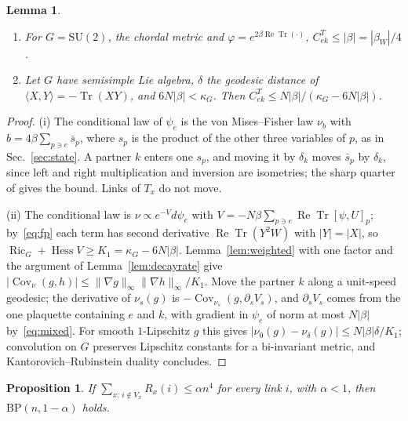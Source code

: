 \documentclass[11pt]{amsart}
\newtheorem{lemma}[theorem]{Lemma}
\newtheorem{proposition}[theorem]{Proposition}
\theoremstyle{definition}
\theoremstyle{remark}
\numberwithin{equation}{section}
\newcommand{\SU}{\mathrm{SU}}
\newcommand{\Tr}{\operatorname{Tr}}
\newcommand{\ReTr}{\operatorname{Re}\operatorname{Tr}}
\newcommand{\Hess}{\operatorname{Hess}}
\newcommand{\Ric}{\operatorname{Ric}}
\newcommand{\Cov}{\operatorname{Cov}}
\newcommand{\ip}[2]{\langle #1,#2\rangle}
\newcommand{\BP}{\mathrm{BP}}
\begin{document}
\begin{lemma}\label{lem:onelink}
\begin{enumerate}[label=\textup{(\roman*)},leftmargin=*]
\item For $G=\SU(2)$, the chordal metric and $\varphi=e^{2\beta\ReTr(\cdot)}$,
$C^T_{ek}\le|\beta|=|\beta_W|/4$.
\item Let $G$ have semisimple Lie algebra, $\delta$ the geodesic distance of
$\ip XY=-\Tr(XY)$, and $6N|\beta|<\kappa_G$. Then $C^T_{ek}\le N|\beta|/
(\kappa_G-6N|\beta|)$.
\end{enumerate}
\end{lemma}

\begin{proof}
(i) The conditional law of $\psi_e$ is the von Mises--Fisher law $\nu_b$ with
$b=4\beta\sum_{p\ni e}\bar s_p$, where $s_p$ is the product of the other three
variables of $p$, as in Sec.~\ref{sec:state}. A partner $k$ enters one
$s_p$, and moving it by $\delta_k$ moves $\bar s_p$ by $\delta_k$, since left and
right multiplication and inversion are isometries; the sharp quarter of
\cite{BB26a} gives the bound. Links of $T_x$ do not move.

(ii) The conditional law is $\nu\propto e^{-V}d\psi_e$ with $V=-N\beta
\sum_{p\ni e}\ReTr[\psi,U]_p$; by~\eqref{eq:fp} each term has second
derivative $\ReTr(Y^2W)$ with $|Y|=|X|$, so $\Ric_G+\Hess V\ge K_1=
\kappa_G-6N|\beta|$. Lemma~\ref{lem:weighted} with one factor and the argument
of Lemma~\ref{lem:decayrate} give $|\Cov_\nu(g,h)|\le\|\nabla g\|_\infty
\|\nabla h\|_\infty/K_1$. Move the partner $k$ along a unit-speed geodesic; the
derivative of $\nu_s(g)$ is $-\Cov_{\nu_s}(g,\partial_sV_s)$, and $\partial_sV_s$
comes from the one plaquette containing $e$ and $k$, with gradient in $\psi_e$
of norm at most $N|\beta|$ by~\eqref{eq:mixed}. For smooth $1$-Lipschitz $g$
this gives $|\nu_0(g)-\nu_\delta(g)|\le N|\beta|\delta/K_1$; convolution on $G$
preserves Lipschitz constants for a bi-invariant metric, and
Kantorovich--Rubinstein duality concludes.
\end{proof}

\begin{proposition}\label{prop:interiorbp}
If $\sum_{x:\,i\notin V_x}R_x(i)\le\alpha n^4$ for every link $i$, with
$\alpha<1$, then $\BP(n,1-\alpha)$ holds.
\end{proposition}
\end{document}
